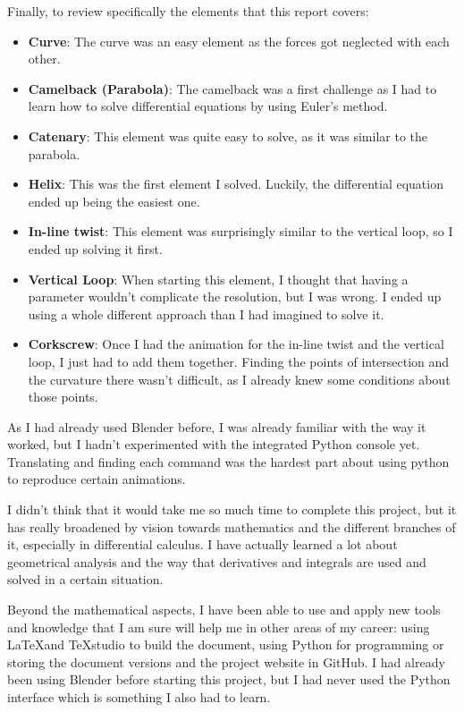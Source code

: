 \documentclass[12pt,twoside,a4paper]{article}
\begin{document}
	Finally, to review specifically the elements that this report covers:
	\begin{itemize}
		\item \textbf{Curve}: The curve was an easy element as the forces got neglected with each other.
		\item \textbf{Camelback (Parabola)}: The camelback was a first challenge as I had to learn how to solve differential equations by using Euler's method.
		\item \textbf{Catenary}: This element was quite easy to solve, as it was similar to the parabola.
		\item \textbf{Helix}: This was the first element I solved. Luckily, the differential equation ended up being the easiest one.
		\item \textbf{In-line twist}: This element was surprisingly similar to the vertical loop, so I ended up solving it first.
		\item \textbf{Vertical Loop}: When starting this element, I thought that having a parameter wouldn't complicate the resolution, but I was wrong. I ended up using a whole different approach than I had imagined to solve it.
		\item \textbf{Corkscrew}: Once I had the animation for the in-line twist and the vertical loop, I just had to add them together. Finding the points of intersection and the curvature there wasn't difficult, as I already knew some conditions about those points.
	\end{itemize}
	
	As I had already used Blender before, I was already familiar with the way it worked, but I hadn't experimented with the integrated Python console yet. Translating and finding each command was the hardest part about using python to reproduce certain animations.
	
	I didn't think that it would take me so much time to complete this project, but it has really broadened by vision towards mathematics and the different branches of it, especially in differential calculus. I have actually learned a lot about geometrical analysis and the way that derivatives and integrals are used and solved in a certain situation.
	
	Beyond the mathematical aspects, I have been able to use and apply new tools and knowledge that I am sure will help me in other areas of my career: using \LaTeX and TeXstudio to build the document, using Python for programming or storing the document versions and the project website in GitHub. I had already been using Blender before starting this project, but I had never used the Python interface which is something I also had to learn.
	
\end{document}
